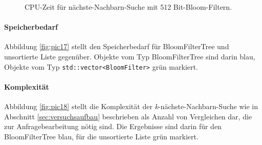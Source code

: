\begin{figure}[hptb]
	\caption[CPU-Zeit für 3-nächste-Nachbarn-Suche mit 512 Bit-Bloom-Filtern]{CPU-Zeit für nächste-Nachbarn-Suche mit 512 Bit-Bloom-Filtern.}\label{fig:pic16}
\end{figure}
\paragraph*{Speicherbedarf}
Abbildung \ref{fig:pic17} stellt den Speicherbedarf für BloomFilterTree und unsortierte Liste gegenüber. Objekte vom Typ BloomFilterTree sind darin blau, Objekte vom Typ \texttt{std::vector<BloomFilter>} grün markiert. 
\paragraph*{Komplexität}
Abbildung \ref{fig:pic18} stellt die Komplexität der \textit{k}-nächste-Nachbarn-Suche wie in Abschnitt \ref{sec:versuchsaufbau} beschrieben als Anzahl von Vergleichen dar, die zur Anfragebearbeitung nötig sind. Die Ergebnisse sind darin für den BloomFilterTree blau, für die unsortierte Liste grün markiert.
